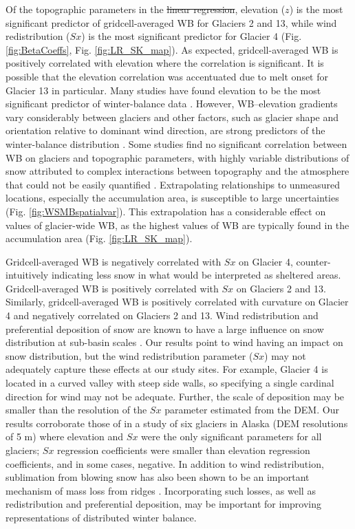 \documentclass[review,oneside, letterpaper]{igs} %
\providecommand{\DIFadd}[1]{{\protect\color{blue}\uwave{#1}}} %
\providecommand{\DIFdel}[1]{{\protect\color{red}\sout{#1}}}                      %
\providecommand{\DIFaddbegin}{} %
\providecommand{\DIFaddend}{} %
\providecommand{\DIFdelbegin}{} %
\providecommand{\DIFdelend}{} %
\newcommand{\DIFscaledelfig}{0.5}
\newlength{\DIFdelgraphicswidth} %
\newlength{\DIFdelgraphicsheight} %
\newcommand{\DIFaddincludegraphics}[2][]{{\color{blue}\fbox{\DIFOincludegraphics[#1]{#2}}}} %
\newcommand{\DIFdelincludegraphics}[2][]{%
\sbox{\DIFdelgraphicsbox}{\DIFOincludegraphics[#1]{#2}}%
\settoboxwidth{\DIFdelgraphicswidth}{\DIFdelgraphicsbox} %
\settoboxtotalheight{\DIFdelgraphicsheight}{\DIFdelgraphicsbox} %
\scalebox{\DIFscaledelfig}{%
\parbox[b]{\DIFdelgraphicswidth}{\usebox{\DIFdelgraphicsbox}\\[-\baselineskip] \rule{\DIFdelgraphicswidth}{0em}}\llap{\resizebox{\DIFdelgraphicswidth}{\DIFdelgraphicsheight}{%
\setlength{\unitlength}{\DIFdelgraphicswidth}%
\begin{picture}(1,1)%
\thicklines\linethickness{2pt} %
{\color[rgb]{1,0,0}\put(0,0){\framebox(1,1){}}}%
{\color[rgb]{1,0,0}\put(0,0){\line( 1,1){1}}}%
{\color[rgb]{1,0,0}\put(0,1){\line(1,-1){1}}}%
\end{picture}%
}\hspace*{3pt}}} %
} %
\DeclareRobustCommand{\DIFaddbegin}{\DIFOaddbegin \let\includegraphics\DIFaddincludegraphics} %
\DeclareRobustCommand{\DIFaddend}{\DIFOaddend \let\includegraphics\DIFOincludegraphics} %
\DeclareRobustCommand{\DIFdelbegin}{\DIFOdelbegin \let\includegraphics\DIFdelincludegraphics} %
\DeclareRobustCommand{\DIFdelend}{\DIFOaddend \let\includegraphics\DIFOincludegraphics} %
\begin{document}
Of the topographic parameters in the \DIFdelbegin \DIFdel{linear regression}\DIFdelend \DIFaddbegin \DIFadd{LR}\DIFaddend , elevation ($z$) is the most significant predictor of gridcell-averaged WB for Glaciers 2 and 13, while wind redistribution ($Sx$) is the most significant predictor for Glacier 4 (Fig. \ref{fig:BetaCoeffs}, Fig. \ref{fig:LR_SK_map}). As expected, gridcell-averaged WB is positively correlated with elevation where the correlation is significant. It is possible that the elevation correlation was accentuated due to melt onset for Glacier 13 in particular. Many  studies have found elevation to be the most significant predictor of winter-balance data \citep[e.g.][]{Machguth2006, McGrath2015}. However, WB--elevation gradients vary considerably between glaciers \citep[e.g.][]{Winther1998} and other factors, such as glacier shape and orientation relative to dominant wind direction, are strong predictors of the winter-balance distribution \citep{Machguth2006,Grabiec2011}. Some studies find no significant correlation between WB on glaciers and topographic parameters, with highly variable distributions of snow attributed to complex interactions between topography and the atmosphere that could not be easily quantified \citep[e.g.][]{Grabiec2011,Lopez2011}. Extrapolating relationships to unmeasured locations, especially the accumulation area, is susceptible to large uncertainties (Fig. \ref{fig:WSMBspatialvar}). This extrapolation has a considerable effect on values of glacier-wide WB, as the highest values of WB are typically found in the accumulation area  (Fig. \ref{fig:LR_SK_map}). 

Gridcell-averaged WB is negatively correlated with $Sx$ on Glacier 4, counter-intuitively indicating less snow in what would be interpreted as sheltered areas. Gridcell-averaged WB is positively correlated with $Sx$ on Glaciers 2 and 13. Similarly, gridcell-averaged WB is positively correlated with curvature on Glacier 4 and negatively correlated on Glaciers 2 and 13. Wind redistribution and preferential deposition of snow are known to have a large influence on snow distribution at sub-basin scales \citep[e.g.][]{Dadic2010, Winstral2013,Gerber2017}. Our results point to wind having an impact on snow distribution, but the wind redistribution parameter ($Sx$) may not adequately capture these effects at our study sites. For example, Glacier 4 is located in a curved valley with steep side walls, so specifying a single cardinal direction for wind may not be adequate. Further, the scale of deposition may be smaller than the resolution of the $Sx$ parameter estimated from the DEM. Our results corroborate those of \cite{McGrath2015} in a study of six glaciers in Alaska (DEM resolutions of 5 m) where elevation and $Sx$ were the only significant parameters for all glaciers; $Sx$ regression coefficients were smaller than elevation regression coefficients, and in some cases, negative. In addition to wind redistribution, sublimation from blowing snow has also been shown to be an important mechanism of mass loss from ridges  \citep[e.g.][]{Musselman2015}. Incorporating such losses, as well as redistribution and preferential deposition, may be important for improving representations of distributed winter balance. 
\end{document}
